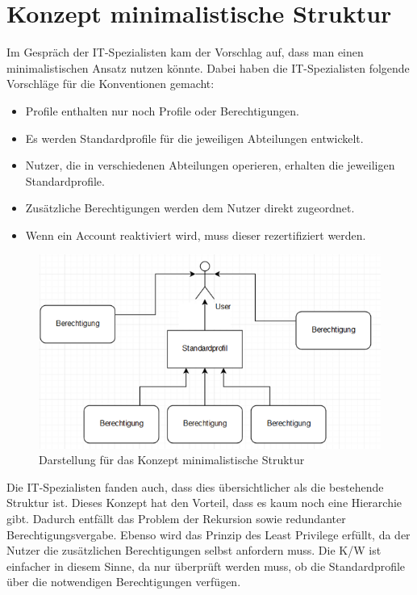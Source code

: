 \section{Konzept minimalistische Struktur}
\label{sec:chapter04:minimal}
Im Gespräch der IT-Spezialisten kam der Vorschlag auf, dass man einen minimalistischen Ansatz nutzen könnte.
Dabei haben die IT-Spezialisten folgende Vorschläge für die Konventionen gemacht:
\newline
\begin{itemize}
	\item Profile enthalten nur noch Profile oder Berechtigungen.
	\item Es werden Standardprofile für die jeweiligen Abteilungen entwickelt.
	\item Nutzer, die in verschiedenen Abteilungen operieren, erhalten die jeweiligen Standardprofile.
	\item Zusätzliche Berechtigungen werden dem Nutzer direkt zugeordnet.
	\item Wenn ein Account reaktiviert wird, muss dieser rezertifiziert werden.
\end{itemize}
\begin{figure}[h!]
 \centering
 \includegraphics[width=1\textwidth]{gfx/Picture/Minimal.PNG}
 \caption{Darstellung für das Konzept minimalistische Struktur}
 \label{fig:Min}
\end{figure}
Die IT-Spezialisten fanden auch, dass dies übersichtlicher als die bestehende Struktur ist.
Dieses Konzept hat den Vorteil, dass es kaum noch eine Hierarchie gibt.
Dadurch entfällt das Problem der Rekursion sowie redundanter Berechtigungsvergabe.
Ebenso wird das Prinzip des Least Privilege erfüllt, da der Nutzer die zusätzlichen Berechtigungen selbst anfordern muss.
Die \ac{K/W} ist einfacher in diesem Sinne, da nur überprüft werden muss, ob die Standardprofile über die notwendigen Berechtigungen verfügen.
